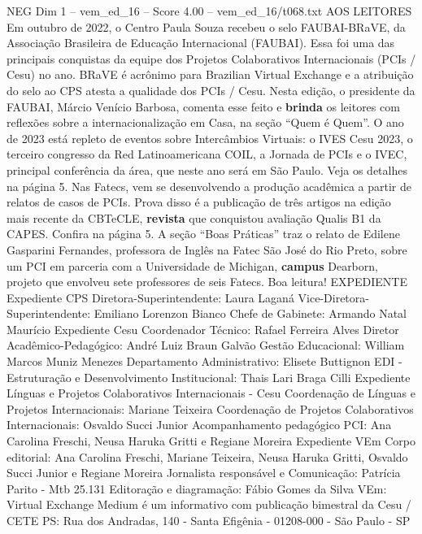 \begin{textsample}{NEG Dim 1 – vem\_ed\_16 – Score 4.00 – vem\_ed\_16/t068.txt}  \label{ex:f1_neg_098}
AOS LEITORES Em outubro de 2022, o Centro Paula Souza recebeu o selo FAUBAI-BRaVE, da Associação Brasileira de Educação Internacional (FAUBAI).
Essa foi uma das principais conquistas da equipe dos Projetos Colaborativos Internacionais (PCIs / Cesu) no ano.
BRaVE é acrônimo para Brazilian Virtual Exchange e a atribuição do selo ao CPS atesta a qualidade dos PCIs / Cesu.
Nesta edição, o presidente da FAUBAI, Márcio Venício Barbosa, comenta esse feito e \textbf{brinda} os leitores com reflexões sobre a internacionalização em Casa, na seção “Quem é Quem”.
O ano de 2023 está repleto de eventos sobre Intercâmbios Virtuais: o IVES Cesu 2023, o terceiro congresso da Red Latinoamericana COIL, a Jornada de PCIs e o IVEC, principal conferência da área, que neste ano será em São Paulo.
Veja os detalhes na página 5.
Nas Fatecs, vem se desenvolvendo a produção acadêmica a partir de relatos de casos de PCIs.
Prova disso é a publicação de três artigos na edição mais recente da CBTeCLE, \textbf{revista} que conquistou avaliação Qualis B1 da CAPES.
Confira na página 5.
A seção “Boas Práticas” traz o relato de Edilene Gasparini Fernandes, professora de Inglês na Fatec São José do Rio Preto, sobre um PCI em parceria com a Universidade de Michigan, \textbf{campus} Dearborn, projeto que envolveu sete professores de seis Fatecs.
Boa leitura!
EXPEDIENTE Expediente CPS Diretora-Superintendente: Laura Laganá Vice-Diretora-Superintendente: Emiliano Lorenzon Bianco Chefe de Gabinete: Armando Natal Maurício Expediente Cesu Coordenador Técnico: Rafael Ferreira Alves Diretor Acadêmico-Pedagógico: André Luiz Braun Galvão Gestão Educacional: William Marcos Muniz Menezes Departamento Administrativo: Elisete Buttignon EDI - Estruturação e Desenvolvimento Institucional: Thais Lari Braga Cilli Expediente Línguas e Projetos Colaborativos Internacionais - Cesu Coordenação de Línguas e Projetos Internacionais: Mariane Teixeira Coordenação de Projetos Colaborativos Internacionais: Osvaldo Succi Junior Acompanhamento pedagógico PCI: Ana Carolina Freschi, Neusa Haruka Gritti e Regiane Moreira Expediente VEm Corpo editorial: Ana Carolina Freschi, Mariane Teixeira, Neusa Haruka Gritti, Osvaldo Succi Junior e Regiane Moreira Jornalista responsável e Comunicação: Patrícia Parito - Mtb 25.131 Editoração e diagramação: Fábio Gomes da Silva VEm: Virtual Exchange Medium é um informativo com publicação bimestral da Cesu / CETE PS: Rua dos Andradas, 140 - Santa Efigênia - 01208-000 - São Paulo - SP

\end{textsample}
